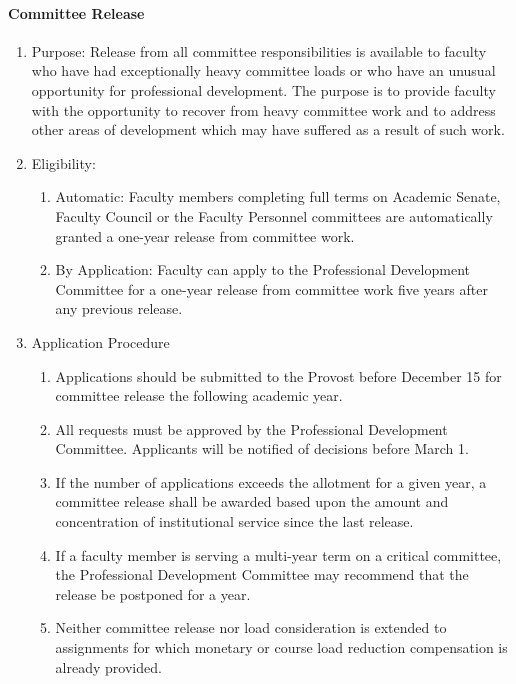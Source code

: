 \documentclass[letterpaper, 11pt]{article}
\begin{document}
			\paragraph{Committee Release}
				\begin{enumerate}[label=\alph*)]
					\item{Purpose:  Release from all committee responsibilities is available to faculty who have had exceptionally heavy committee loads or who have an unusual opportunity for professional development.  The purpose is to provide faculty with the opportunity to recover from heavy committee work and to address other areas of development which may have suffered as a result of such work.}
					\item{Eligibility:
						\begin{enumerate}[label=\arabic*)]
							\item{Automatic:  Faculty members completing full terms on Academic Senate, Faculty Council or the Faculty Personnel committees are automatically granted a one-year release from committee work.}
							\item{By Application:  Faculty can apply to the Professional Development Committee for a one-year release from committee work five years after any previous release.}
						\end{enumerate}
					}
					\item{Application Procedure
						\begin{enumerate}[label=\arabic*)]
							\item{Applications should be submitted to the Provost before December 15 for committee release the following academic year.}
							\item{All requests must be approved by the Professional Development Committee.  Applicants will be notified of decisions before March 1.}
							\item{If the number of applications exceeds the allotment for a given year, a committee release shall be awarded based upon the amount and concentration of institutional service since the last release.}
							\item{If a faculty member is serving a multi-year term on a critical committee, the Professional Development Committee may recommend that the release be postponed for a year.}
							\item{Neither committee release nor load consideration is extended to assignments for which monetary or course load reduction compensation is already provided.}
						\end{enumerate}
					}
				\end{enumerate}
\end{document}
